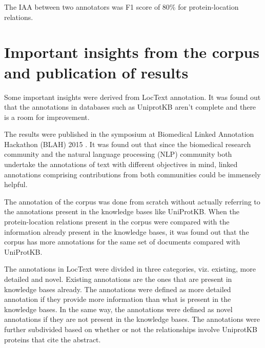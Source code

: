 The IAA between two annotators was F1 score of 80\% for protein-location relations.

\section{Important insights from the corpus and publication of results}

Some important insights were derived from LocText annotation. It was found out that the annotations in databases such as UniprotKB aren't complete and there is a room for improvement.

The results \cite{goldberg2015linked} were published in the symposium at Biomedical Linked Annotation Hackathon (BLAH) 2015 \cite{blah}. It was found out that since the biomedical research community and the natural language processing (NLP) community both undertake the annotations of text with different objectives in mind, linked annotations comprising contributions from both communities could be immensely helpful. 

The annotation of the corpus was done from scratch without actually referring to the annotations present in the knowledge bases like UniProtKB. When the protein-location relations present in the corpus were compared with the information already present in the knowledge bases, it was found out that the corpus has more annotations for the same set of documents compared with UniProtKB.

The annotations in LocText were divided in three categories, viz. existing, more detailed and novel. Existing annotations are the ones that are present in knowledge bases already. The annotations were defined as more detailed annotation if they provide more information than what is present in the knowledge bases. In the same way, the annotations were defined as novel annotations if they are not present in the knowledge bases. The annotations were further subdivided based on whether or not the relationships involve UniprotKB proteins that cite the abstract.

